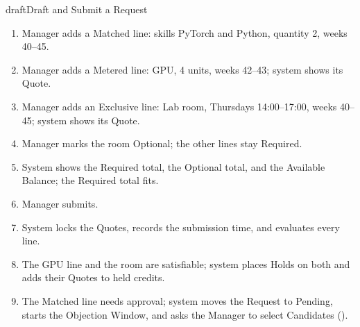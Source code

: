 \begin{usecase}{draft}{Draft and Submit a Request}
{\begin{enumerate}
\item Manager adds a Matched line: skills PyTorch and Python, quantity 2, weeks 40--45.
\item Manager adds a Metered line: GPU, 4 units, weeks 42--43; system shows its Quote.
\item Manager adds an Exclusive line: Lab room, Thursdays 14:00--17:00, weeks 40--45; system shows its Quote.
\item Manager marks the room Optional; the other lines stay Required.
\item System shows the Required total, the Optional total, and the Available Balance; the Required total fits.
\item Manager submits.
\item System locks the Quotes, records the submission time, and evaluates every line.
\item The GPU line and the room are satisfiable; system places Holds on both and adds their Quotes to held credits.
\item The Matched line needs approval; system moves the Request to Pending, starts the Objection Window, and asks the Manager to select Candidates ().
\end{enumerate}}
\end{usecase}
